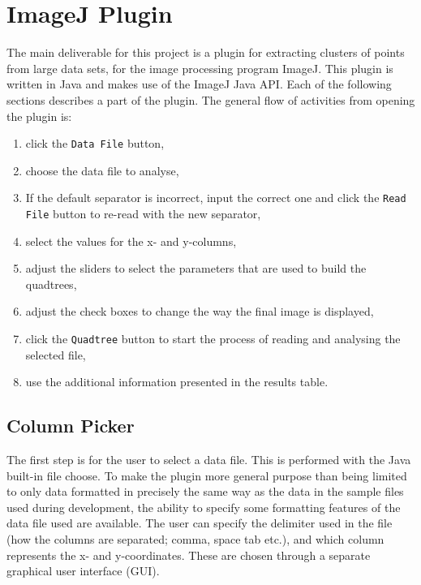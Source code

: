 
\section{ImageJ Plugin}
\label{sec:imagej_plugin}

The main deliverable for this project is a plugin for extracting clusters of
points from large data sets, for the image processing program ImageJ. This
plugin is written in Java and makes use of the ImageJ Java API\cite{imagejapi}.
Each of the following sections describes a part of the plugin. The general flow
of activities from opening the plugin is:

\begin{enumerate}
	\item click the \texttt{Data File} button,
	\item choose the data file to analyse,
	\item If the default separator is incorrect, input the correct one and
		click the \texttt{Read File} button to re-read with the new separator,
	\item select the values for the x- and y-columns,
	\item adjust the sliders to select the parameters that are used to build
		the quadtrees,
	\item adjust the check boxes to change the way the final image is
		displayed,
	\item click the \texttt{Quadtree} button to start the process of reading
		and analysing the selected file,
	\item use the additional information presented in the results table.
\end{enumerate}

\subsection{Column Picker}
\label{sub:column_picker}

The first step is for the user to select a data file. This is performed with
the Java built-in file choose. To make the plugin more general purpose than
being limited to only data formatted in precisely the same way as the data in
the sample files used during development, the ability to specify some
formatting features of the data file used are available. The user can specify
the delimiter used in the file (how the columns are separated; comma, space tab
etc.), and which column represents the x- and y-coordinates. These are chosen
through a separate graphical user interface (GUI).

